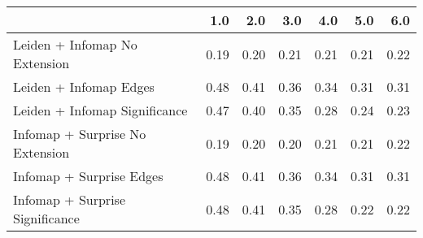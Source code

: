 \begin{tabular}{lrrrrrr}
\toprule
{} &  1.0 &  2.0 &  3.0 &  4.0 &  5.0 &  6.0 \\
\midrule
Leiden + Infomap No Extension   & 0.19 & 0.20 & 0.21 & 0.21 & 0.21 & 0.22 \\
Leiden + Infomap Edges          & 0.48 & 0.41 & 0.36 & 0.34 & 0.31 & 0.31 \\
Leiden + Infomap Significance   & 0.47 & 0.40 & 0.35 & 0.28 & 0.24 & 0.23 \\
Infomap + Surprise No Extension & 0.19 & 0.20 & 0.20 & 0.21 & 0.21 & 0.22 \\
Infomap + Surprise Edges        & 0.48 & 0.41 & 0.36 & 0.34 & 0.31 & 0.31 \\
Infomap + Surprise Significance & 0.48 & 0.41 & 0.35 & 0.28 & 0.22 & 0.22 \\
\bottomrule
\end{tabular}

